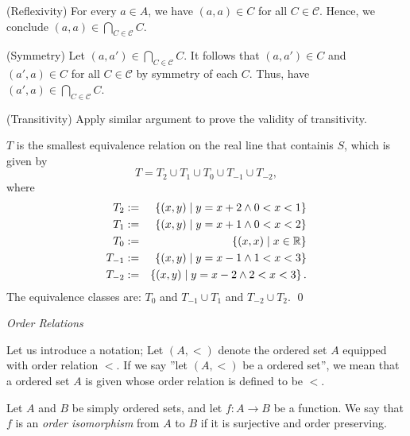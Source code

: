 \documentclass[a4paper,12pt]{article}
\begin{document}
\begin{sol}
	(Reflexivity)
	For every
	\( a \in A \),
	we have
	\( (a,a) \in C \)
	for all
	\( C\in \mathcal{C} \).
	Hence, we conclude
	\( (a,a) \in \bigcap_{C \in \mathcal{C}}C \).
	
	(Symmetry)
	Let 
	\( (a,a') \in \bigcap_{C \in \mathcal{C}}C \).
	It follows that
	\( (a,a') \in C \)
	and 
	\( (a',a) \in C \)
	for all
	\( C\in \mathcal{C} \)
	by symmetry of each \( C \).
	Thus, have
	\( (a',a) \in \bigcap_{C \in \mathcal{C}}C \).
	
	(Transitivity)
	Apply similar argument to prove the validity of transitivity.
	
	\( T \)
	is the smallest equivalence relation on the real line that containis \( S \),
	which is given by
	\begin{equation*}
		T=T_2 \cup T_1 \cup T_0 \cup T_{-1}\cup T_{-2},
	\end{equation*}
	where
	\begin{eqnarray*}
		T_2		&:=&\left\{ (x,y) \;|\; y=x+2 \wedge 0<x<1	\right\}\\
		T_1		&:=&\left\{ (x,y) \;|\; y=x+1 \wedge 0<x<2	\right\}\\
		T_0		&:=&\left\{ (x,x) \;|\; x \in \mathbb{R}		\right\}\\
		T_{-1}	&:=&\left\{ (x,y) \;|\; y=x -1 \wedge 1<x<3	\right\}\\
		T_{-2}	&:=&\left\{ (x,y) \;|\; y=x -2 \wedge 2<x<3	\right\}.
	\end{eqnarray*}
	The equivalence classes are:
	\( T_0 \) and \( T_{-1} \cup T_{1} \) and \( T_{-2} \cup T_{2} \).
	\qed\end{sol}

\leavevmode \par
\noindent\textit{Order Relations}\leavevmode \par
Let us introduce a notation;
Let \( (A,<) \) denote the ordered set \( A \) equipped with order relation \( < \).
If we say ''let \(  (A,<) \) be a ordered set'',
we mean that a ordered set \( A \) is given whose order relation is defined to be \( < \).

\begin{dfn}
	Let \( A \) and \( B \) be simply ordered sets, and let \( f: A\to B \) be a function.
	We say that \( f \) is an \textit{order isomorphism} from \( A \) to \( B \)
	if it is surjective and order preserving.
\end{dfn}
\end{document}
